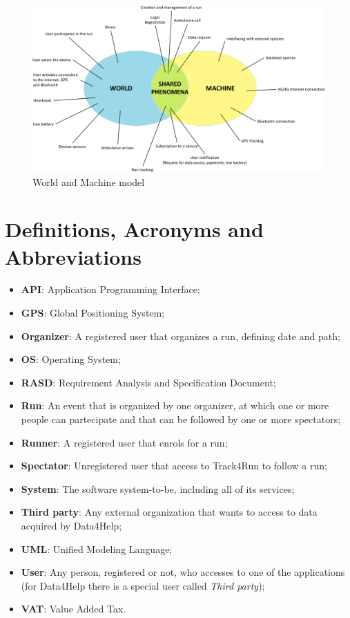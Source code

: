 \begin{figure}[H]
\begin{center}
  \includegraphics[width=\textwidth]{img/WorldMachine.png}
  \hspace{0.05\linewidth}
  \centering
  \caption{World and Machine model}
  \label{img:WandMmodel}
\end{center}
\end{figure}

\section{Definitions, Acronyms and Abbreviations}
\begin{itemize}
  \setlength{\itemindent}{-.4in}
  \item[] \textbf{API}: Application Programming Interface;
  \item[] \textbf{GPS}: Global Positioning System;
  \item[] \textbf{Organizer}: A registered user that organizes a run, defining date and path;
  \item[] \textbf{OS}: Operating System;
  \item[] \textbf{RASD}: Requirement Analysis and Specification Document;
  \item[] \textbf{Run}: An event that is organized by one organizer, at which one or more people can partecipate and that can be followed by one or more spectators;
  \item[] \textbf{Runner}: A registered user that enrols for a run;
  \item[] \textbf{Spectator}: Unregistered user that access to Track4Run to follow a run;
  \item[] \textbf{System}: The software system-to-be, including all of its services;
  \item[] \textbf{Third party}: Any external organization that wants to access to data acquired by Data4Help;
  \item[] \textbf{UML}: Unified Modeling Language;
  \item[] \textbf{User}: Any person, registered or not, who accesses to one of the applications (for Data4Help there is a special user called \textit{Third party});
  \item[] \textbf{VAT}: Value Added Tax.
\end{itemize}

